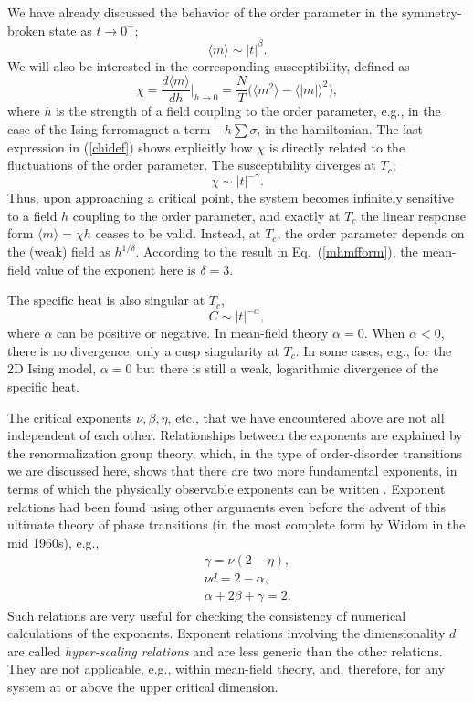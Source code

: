 \documentclass[draft,numberedheadings]{aipproc}
\begin{document}
We have already discussed the behavior of the order parameter in the symmetry-broken state as $t \to 0^-$;
\begin{equation}
\langle m\rangle \sim |t|^\beta.
\end{equation}
We will also be interested in the corresponding susceptibility, defined as
\begin{equation}
\chi = \frac{d\langle m\rangle}{dh}\Big |_{h\to 0} = \frac{N}{T}\bigl ( \langle m^2\rangle - \langle |m|\rangle^2 \bigr ),
\label{chidef}
\end{equation}
where $h$ is the strength of a field coupling to the order parameter, e.g., in the case of the Ising ferromagnet a term $-h\sum \sigma_i$ in the hamiltonian. 
The last expression in (\ref{chidef}) shows explicitly how $\chi$ is directly related to the fluctuations of the order parameter. The susceptibility 
diverges at $T_c$;
\begin{equation}
\chi \sim |t|^{-\gamma}.
\label{chidiv}
\end{equation}
Thus, upon approaching a critical point, the system becomes infinitely sensitive to a field $h$ coupling to the order parameter, and exactly at $T_c$ 
the linear response form $\langle m\rangle = \chi h$ ceases to be valid. Instead, at $T_c$, the order parameter depends on the (weak) field as 
$h^{1/\delta}$. According to the result in Eq.~(\ref{mhmfform}), the mean-field value of the exponent here is $\delta=3$.

The specific heat is also singular at $T_c$,
\begin{equation}
C \sim |t|^{-\alpha},
\end{equation}
where $\alpha$ can be positive or negative. In mean-field theory $\alpha=0$. When $\alpha < 0$, there is no divergence, only a cusp singularity at $T_c$. 
In some cases, e.g., for the 2D Ising model, $\alpha=0$ but there is still a weak, logarithmic divergence of the specific heat.  

The critical exponents $\nu,\beta,\eta$, etc., that we have encountered above are not all independent of each other. Relationships between the exponents are 
explained by the renormalization group theory, which, in the type of order-disorder transitions we are discussed here, shows that there are two more fundamental 
exponents, in terms of which the physically observable exponents can be written \cite{cardy}. Exponent relations had been found using other arguments even before 
the advent of this ultimate theory of phase transitions (in the most complete form by Widom in the mid 1960s), e.g.,
\begin{eqnarray}
&& \gamma = \nu (2-\eta), \nonumber \\
&& \nu d = 2-\alpha, \\
&& \alpha + 2\beta + \gamma = 2. \nonumber
\label{exprelations}
\end{eqnarray}
Such relations are very useful for checking the consistency of numerical calculations of the exponents. Exponent relations involving the dimensionality $d$ are 
called {\it hyper-scaling relations} and are less generic than the other relations. They are not applicable, e.g., within mean-field theory, and, therefore, for any 
system at or above the upper critical dimension. 
\end{document}
